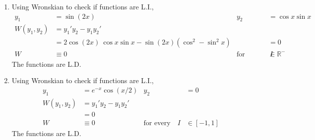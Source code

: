 \begin{enumerate}
    \item Using Wronskian to check if functions are L.I.,
          \begin{align}
              y_{1}                    & = \sin (2x)                           &
              y_{2}                    & = \cos x \sin x                         \\
              W(y_{1}, y_{2})          & = y_{1}'y_{2} - y_{1}y_{2}'             \\
                                       & = 2\cos(2x)\ \cos x \sin x - \sin(2x)
              (\cos ^{2}
              - \sin ^{2}x)            &
                                       & = 0                                     \\
              W                        & \equiv 0                              &
              \text{for every} \quad I & \in \mathbb{R}^{-}
          \end{align}
          The functions are L.D.

    \item Using Wronskian to check if functions are L.I.,
          \begin{align}
              y_{1}                    & = e^{-x}\cos(x/2)           &
              y_{2}                    & = 0                           \\
              W(y_{1}, y_{2})          & = y_{1}'y_{2} - y_{1}y_{2}'   \\
                                       & = 0                           \\
              W                        & \equiv 0                    &
              \text{for every} \quad I & \in [-1, 1]
          \end{align}
          The functions are L.D.


\end{enumerate}
